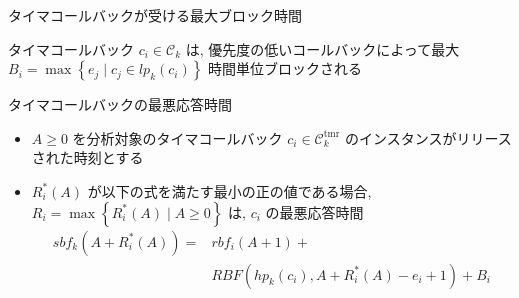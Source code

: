 
\begin{frame}[label=lemma2]{タイマコールバックが受ける最大ブロック時間}
    \begin{lemma}[タイマコールバックが受ける最大ブロック時間]
        タイマコールバック $c_{i} \in \mathcal{C}_{k}$ は, 優先度の低いコールバックによって最大 $B_{i}=\max \left\{e_{j} \mid c_{j} \in l p_{k}\left(c_{i}\right)\right\}$ 時間単位ブロックされる
    \end{lemma}
\end{frame}

\begin{frame}[label=lemma3]{タイマコールバックの最悪応答時間}
    \begin{lemma}[タイマコールバックの最悪応答時間]
        \begin{itemize}
            \item $A \geq 0$ を分析対象のタイマコールバック $c_{i} \in \mathcal{C}_{k}^{\mathrm{tmr}}$ のインスタンスがリリースされた時刻とする
            \item $R_{i}^{*}(A)$ が以下の式を満たす最小の正の値である場合, $R_{i}=\max \left\{R_{i}^{*}(A) \mid A \geq 0\right\}$ は, $c_{i}$ の最悪応答時間
                  \begin{equation*}
                      \begin{split}
                          s b f_{k}\left(A+R_{i}^{*}(A)\right)=&r b f_{i}(A+1)+\\
                          &R B F\left(h p_{k}\left(c_{i}\right), A+R_{i}^{*}(A)-e_{i}+1\right)+B_{i}
                      \end{split}
                  \end{equation*}
        \end{itemize}
    \end{lemma}
\end{frame}

